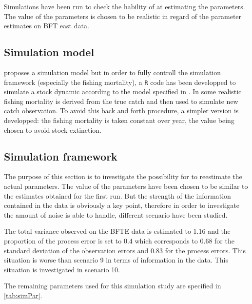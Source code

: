 Simulations have been run to check the hability of \iscam at estimating
the parameters. The value of the parameters is chosen to be realistic in regard of the parameter estimates on BFT east data.

\subsection{Simulation model}
\iscam proposes a simulation model but in order to fully controll the simulation framework (especially the fishing mortality), a \verb+R+ code has been developped to simulate a stock dynamic according to the model specified in \iscam.
In \iscam some realistic fishing mortality is derived from the true catch and then used to simulate new catch observation. 
To avoid this back and forth procedure, a simpler version is developped: 
the fishing mortality is taken constant over year, the value being chosen to avoid stock extinction.


\subsection{Simulation framework}
The purpose of this section is to investigate the possibility for \iscam to reestimate the actual parameters. The value of the parameters have been chosen to be similar to the estimates obtained for the first run.
But the strength of the information contained in the data is obviously a key point, therefore in order to investigate the amount of noise \iscam is able to handle, different scenario have been studied.

The total variance observed on the BFTE data is estimated to $1.16$ and the proportion of the process error is set to $0.4$ which corresponds to $0.68$ for the standard deviation of the observation errors and $0.83$ for the process errors. 
This situation is worse than scenario 9 in terms of information in the data. This situation is investigated in scenario 10.

The remaining parameters used for this simulation study  are specified in \ref{tab:simPar}.		

